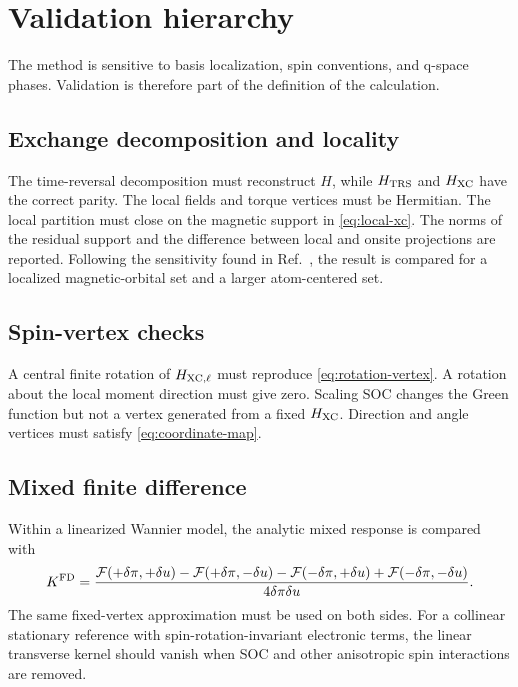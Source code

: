 \section{Validation hierarchy}
\label{sec:validation}

The method is sensitive to basis localization, spin conventions, and q-space phases. Validation is therefore part of the definition of the calculation.

\subsection{Exchange decomposition and locality}

The time-reversal decomposition must reconstruct $H$, while $H_{\mathrm{TRS}}$ and $H_{\mathrm{XC}}$ have the correct parity. The local fields and torque vertices must be Hermitian. The local partition must close on the magnetic support in \cref{eq:local-xc}. The norms of the residual support and the difference between local and onsite projections are reported. Following the sensitivity found in Ref.~\cite{MartinezCarracedo2023}, the result is compared for a localized magnetic-orbital set and a larger atom-centered set.

\subsection{Spin-vertex checks}

A central finite rotation of $H_{\mathrm{XC},\ell}$ must reproduce \cref{eq:rotation-vertex}. A rotation about the local moment direction must give zero. Scaling SOC changes the Green function but not a vertex generated from a fixed $H_{\mathrm{XC}}$. Direction and angle vertices must satisfy \cref{eq:coordinate-map}.

\subsection{Mixed finite difference}

Within a linearized Wannier model, the analytic mixed response is compared with
\begin{equation}
K^{\rm FD}=
\frac{\mathcal F(+\delta\pi,+\delta u)-\mathcal F(+\delta\pi,-\delta u)
-\mathcal F(-\delta\pi,+\delta u)+\mathcal F(-\delta\pi,-\delta u)}
{4\delta\pi\delta u}.
\label{eq:mixed-fd}
\end{equation}
The same fixed-vertex approximation must be used on both sides. For a collinear stationary reference with spin-rotation-invariant electronic terms, the linear transverse kernel should vanish when SOC and other anisotropic spin interactions are removed.

